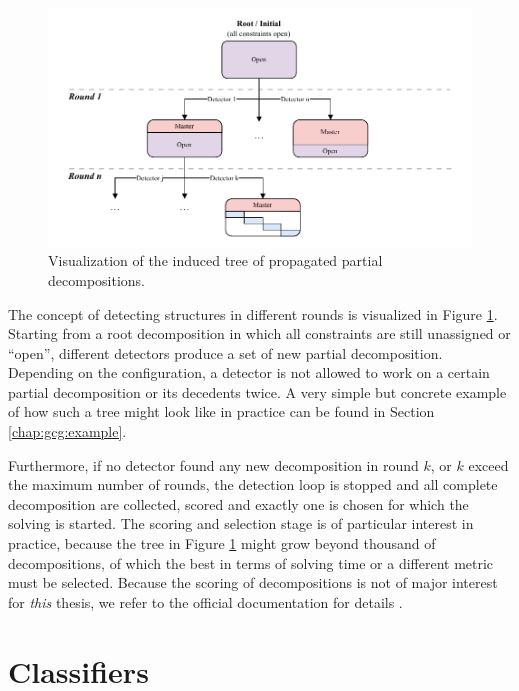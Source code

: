		\begin{figure}[ht!]
			\centering
			\includegraphics{Bilder/DrawIO/partialdec_tree_pdf}
			\caption{Visualization of the induced tree of propagated partial decompositions.}
			\label{fig:gcg:partialdettree}
		\end{figure}
		
		The concept of detecting structures in different rounds is visualized in Figure \ref{fig:gcg:partialdettree}.
		Starting from a root decomposition in which all constraints are still unassigned or \enquote{open}, different detectors produce a set of new partial decomposition.
		Depending on the configuration, a detector is not allowed to work on a certain partial decomposition or its decedents twice.
		A very simple but concrete example of how such a tree might look like in practice can be found in Section \ref{chap:gcg:example}.
		
		Furthermore, if no detector found any new decomposition in round $k$, or $k$ exceed the maximum number of rounds, the detection loop is stopped and all complete decomposition are collected, scored and exactly one is chosen for which the solving is started. 
		The scoring and selection stage is of particular interest in practice, because the tree in Figure \ref{fig:gcg:partialdettree} might grow beyond thousand of decompositions, of which the best in terms of solving time or a different metric must be selected.
		Because the scoring of decompositions is not of major interest for \textit{this} thesis, we refer to the official documentation for details \cite{GCG}.
	
	\clearpage
	
	\section{Classifiers}
	\label{chap:gcg:classifiers}
		
